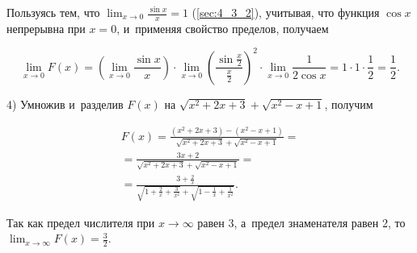 Пользуясь тем, что
$\displaystyle \lim_{x \to 0} \frac{\sin x}{x} = 1$ (\ref{sec:4_3_2}), учитывая, что функция $\cos x$
непрерывна при $x = 0$, и~применяя свойство пределов, получаем

\begin{equation*}
\displaystyle \lim_{x \to 0} F(x) =
\left(
\lim_{x \to 0} \frac{\sin x}{x}
\right) \cdot
\lim_{x \to 0} \left( \frac{\sin \frac{x}{2}}{\frac{x}{2}} \right)^{2} \cdot
\lim_{x \to 0} \frac{1}{2 \cos x} = 
1 \cdot 1 \cdot \frac{1}{2} = \frac{1}{2}.
\end{equation*}

4) Умножив и~разделив $F(x)$ на $\sqrt{x^{2} + 2x + 3} + \sqrt{x^{2} - x + 1 }$,
получим

\begin{multline*}
\displaystyle F(x) =
\frac{\left( x^{2} + 2x + 3 \right) - \left( x^{2} - x + 1 \right)}
{\sqrt{x^{2} + 2x + 3} + \sqrt{x^{2} - x + 1}} = \\
= \frac{3x + 2}{\sqrt{x^{2} + 2x + 3} + \sqrt{x^{2} - x + 1}} = \\
= \frac{3 + \frac{2}{x}}
{\sqrt{1 + \frac{2}{x} + \frac{3}{x^{2}}} + \sqrt{1 - \frac{1}{x} + \frac{1}{x^{2}}}}.
\end{multline*}

\noindent
Так как предел числителя при $x \to \infty$ равен 3, а~предел знаменателя равен 2, то
$\displaystyle \lim_{x \to \infty} F(x) = \frac{3}{2}$.
